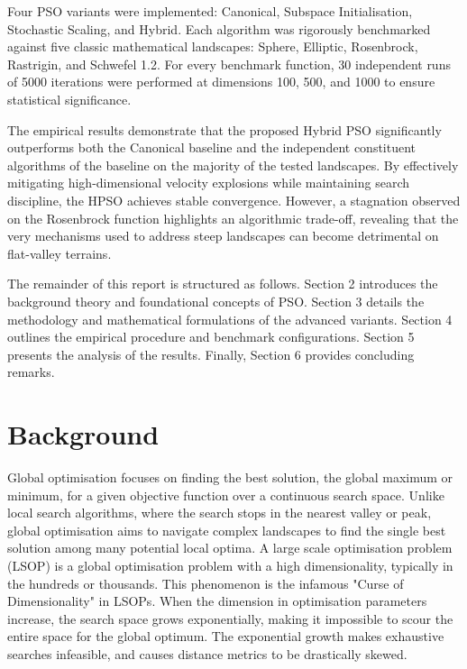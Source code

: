 \documentclass[conference]{IEEEtran}
\begin{document}
    Four PSO variants were implemented: Canonical, Subspace Initialisation, Stochastic Scaling, and Hybrid. Each 
    algorithm was rigorously benchmarked against five classic mathematical landscapes: Sphere, Elliptic, Rosenbrock, 
    Rastrigin, and Schwefel 1.2. For every benchmark function, 30 independent runs of 5000 iterations were performed 
    at dimensions 100, 500, and 1000 to ensure statistical significance. 

    The empirical results demonstrate that the proposed Hybrid PSO significantly outperforms both the Canonical 
    baseline and the independent constituent algorithms of the baseline on the majority of the tested landscapes. By effectively 
    mitigating high-dimensional velocity explosions while maintaining search discipline, the HPSO achieves 
    stable convergence. However, a stagnation observed on the Rosenbrock function 
    highlights an algorithmic trade-off, revealing that the very mechanisms used to address steep landscapes 
    can become detrimental on flat-valley terrains.

    The remainder of this report is structured as follows. Section 2 introduces the background theory and foundational 
    concepts of PSO. Section 3 details the methodology and mathematical formulations of the advanced variants. Section 
    4 outlines the empirical procedure and benchmark configurations. Section 5 presents the analysis of the 
    results. Finally, Section 6 provides concluding remarks.

\section{Background}
    Global optimisation focuses on finding the best solution, the global maximum or minimum, for a given objective function over a 
    continuous search space. Unlike local search algorithms, where the search stops in the nearest valley or peak, global optimisation 
    aims to navigate complex landscapes to find the single best solution among many potential local optima. A large scale optimisation problem 
    (LSOP) is a global optimisation problem with a high dimensionality, typically in the hundreds or thousands. This phenomenon is the infamous 
    "Curse of Dimensionality" in LSOPs. When the dimension in optimisation parameters increase, the search space grows exponentially,  
    making it impossible to scour the entire space for the global optimum. The exponential growth makes exhaustive searches infeasible, and causes distance 
    metrics to be drastically skewed. 
    
\end{document}
